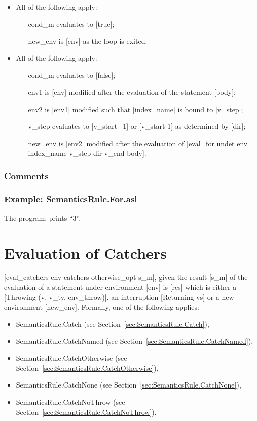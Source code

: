 \documentclass{book}
\begin{document}
    \begin{itemize}
    \item All of the following apply:
      \begin{itemize}
      \item [cond\_m] evaluates to [true];
      \item [new\_env] is [env] as the loop is exited.
      \end{itemize}
    \item All of the following apply:
      \begin{itemize}
      \item [cond\_m] evaluates to [false];
      \item [env1] is [env] modified after the evaluation of the statement [body];
      \item [env2] is [env1] modified such that [index\_name] is bound to [v\_step];
      \item [v\_step] evaluates to [v\_start+1] or [v\_start-1] as determined by [dir];
      \item [new\_env] is [env2] modified after the evaluation of [eval\_for undet
        env index\_name v\_step dir v\_end body].
      \end{itemize}
    \end{itemize}

    \subsection{Comments}

    \subsection{Example: SemanticsRule.For.asl}
    The program:
    prints ``3''.

\chapter{Evaluation of Catchers \label{chap:eval_catchers}}
[eval\_catchers env catchers otherwise\_opt s\_m], given the result [s\_m] of the
evaluation of a statement under environment [env] is [res] which is either a
[Throwing (v, v\_ty, env\_throw)], an interruption [Returning vs] or a new
environment [new\_env]. Formally, one of the following applies:
\begin{itemize}
\item SemanticsRule.Catch (see Section~\ref{sec:SemanticsRule.Catch}),
\item SemanticsRule.CatchNamed (see Section~\ref{sec:SemanticsRule.CatchNamed}),
\item SemanticsRule.CatchOtherwise (see Section~\ref{sec:SemanticsRule.CatchOtherwise}),
\item SemanticsRule.CatchNone (see Section~\ref{sec:SemanticsRule.CatchNone}),
\item SemanticsRule.CatchNoThrow (see Section~\ref{sec:SemanticsRule.CatchNoThrow}).
\end{itemize}
\end{document}
